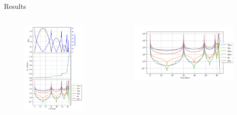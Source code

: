 \documentclass{beamer}
\begin{document}
\begin{frame}{Results}
	\begin{columns}
		\begin{column}{0.3\linewidth}
			\begin{figure}[h]
				\centering
				\includegraphics[height=0.7\textheight]{"../Files/Week 6/properties_s02v70"}
			\end{figure}
		\end{column}
		\begin{column}{0.7\linewidth}
			\begin{figure}[h]
				\centering
				\includegraphics[width = \linewidth]{"../Files/Week 6/properties_s02v70_3"}

\end{figure}
\end{column}
\end{columns}
\end{frame}
\end{document}

